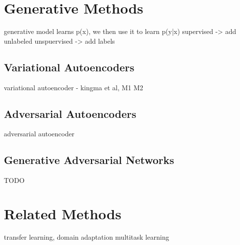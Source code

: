 \section{Generative Methods}
\label{sec:GenerativeSslMethods}

generative model learns p(x), we then use it to learn p(y|x)
supervised -> add unlabeled
unspuervised -> add labels

\subsection{Variational Autoencoders}

variational autoencoder - kingma et al, M1 M2

\subsection{Adversarial Autoencoders}

adversarial autoencoder

\subsection{Generative Adversarial Networks}

TODO


\section{Related Methods}
\label{sec:RelatedSslMethods}

transfer learning, domain adaptation
    multitask learning
